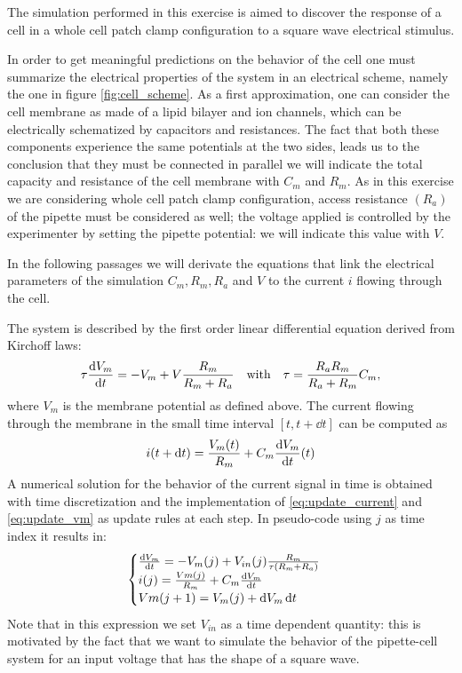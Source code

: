 \documentclass[a4paper]{article}
\begin{document}
The simulation performed in this exercise is aimed to discover the response of a cell in a whole cell patch clamp configuration to a square wave electrical stimulus.

In order to get meaningful predictions on the behavior of the cell one must summarize the electrical properties of the system in an electrical scheme, namely the one in figure \ref{fig:cell_scheme}.
As a first approximation, one can consider the cell membrane as made of a lipid bilayer and ion channels, which can be electrically schematized by capacitors and resistances.
The fact that both these components experience the same potentials at the two sides, leads us to the conclusion that they must be connected in parallel we will indicate the total capacity and resistance of the cell membrane with $C_m$ and $R_m.$
As in this exercise we are considering whole cell patch clamp configuration, access resistance $(R_a)$ of the pipette must be considered as well; the voltage applied is controlled by the experimenter by setting the pipette potential: we will indicate this value with $V.$

In the following passages we will derivate the equations that link the electrical parameters of the simulation $C_m, R_m, R_a$ and $V$ to the current $i$ flowing through the cell.

The system is described by the first order linear differential equation derived from Kirchoff laws:
\begin{equation}
    \tau\dv{V_m}{t} = -V_m +V \frac{R_m}{R_m+R_a} \qq{with} \tau = \frac{R_a R_m}{R_a + R_m}C_m,
    \label{eq:update_vm}
\end{equation}
where $V_m$ is the membrane potential as defined above.
The current flowing through the membrane in the small time interval $[t,t+\dd{t}]$ can be computed as 
\begin{equation}
i(t+\dd{t}) = \frac{V_m(t)}{R_m} + C_m \dv{V_m}{t} {(t)}
\label{eq:update_current}
\end{equation}
A numerical solution for the behavior of the current signal in time is obtained with time discretization and the implementation of \eqref{eq:update_current} and \eqref{eq:update_vm} as update rules at each step.
In pseudo-code using $j$ as time index it results in:
\begin{equation}
    \begin{cases}
        \dv{V_m}{t} = -V_m(j) + V_{in}(j)\frac{R_m}{\tau(R_m +R_a)}\\
        i(j)= \frac{Vm(j)}{R_m} +C_m \dv{V_m}{t}\\
        Vm(j+1) = V_m(j) +\dd{V_m} \dd{t}
    \end{cases}
\end{equation}
Note that in this expression we set $V_{in}$ as a time dependent quantity: this is motivated by the fact that we want to simulate the behavior of the pipette-cell system for an input voltage that has the shape of a square wave.
\end{document}
